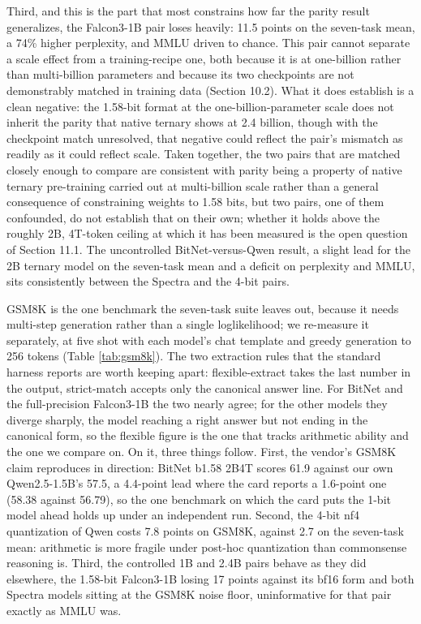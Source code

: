 \documentclass[11pt]{article}
\begin{document}
Third, and this is the part that most constrains how far the parity result generalizes,
the Falcon3-1B pair loses heavily: 11.5 points on the seven-task mean, a 74\% higher
perplexity, and MMLU driven to chance. This pair cannot separate a scale effect from a
training-recipe one, both because it is at one-billion rather than multi-billion
parameters and because its two checkpoints are not demonstrably matched in training data
(Section 10.2). What it does establish is a clean negative: the 1.58-bit format at the
one-billion-parameter scale does not inherit the parity that native ternary shows at 2.4
billion, though with the checkpoint match unresolved, that negative could reflect the
pair's mismatch as readily as it could reflect scale. Taken together, the two pairs that
are matched closely enough to compare are consistent with parity being a property of
native ternary pre-training carried out at multi-billion scale rather than a general
consequence of constraining weights to 1.58 bits, but two pairs, one of them confounded,
do not establish that on their own; whether it holds above the roughly 2B, 4T-token
ceiling at which it has been measured is the open question of Section 11.1. The uncontrolled
BitNet-versus-Qwen result, a slight lead for the 2B ternary model on the seven-task mean
and a deficit on perplexity and MMLU, sits consistently between the Spectra and the 4-bit
pairs.

GSM8K is the one benchmark the seven-task suite leaves out, because it needs multi-step
generation rather than a single loglikelihood; we re-measure it separately, at five shot
with each model's chat template and greedy generation to 256 tokens (Table \ref{tab:gsm8k}).
The two extraction rules that the standard harness reports are worth keeping apart:
flexible-extract takes the last number in the output, strict-match accepts only the
canonical answer line. For BitNet and the full-precision Falcon3-1B the two nearly agree;
for the other models they diverge sharply, the model reaching a right answer but not
ending in the canonical form, so the flexible figure is the one that tracks arithmetic
ability and the one we compare on. On it, three things follow. First, the vendor's
GSM8K claim reproduces in direction: BitNet b1.58 2B4T scores 61.9 against our own Qwen2.5-1.5B's 57.5,
a 4.4-point lead where the card reports a 1.6-point one (58.38 against 56.79), so the one
benchmark on which the card puts the 1-bit model ahead holds up under an independent run.
Second, the 4-bit nf4 quantization of Qwen costs 7.8 points on GSM8K, against 2.7 on the
seven-task mean: arithmetic is more fragile under post-hoc quantization than commonsense
reasoning is. Third, the controlled 1B and 2.4B pairs behave as they did elsewhere, the
1.58-bit Falcon3-1B losing 17 points against its bf16 form and both Spectra models sitting
at the GSM8K noise floor, uninformative for that pair exactly as MMLU was.
\end{document}
